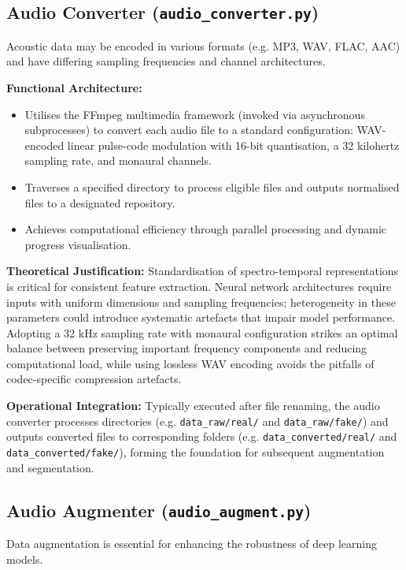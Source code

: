 \documentclass[conference]{IEEEtran}  %
\begin{document}
\subsection{Audio Converter (\texttt{audio\_converter.py})}
Acoustic data may be encoded in various formats (e.g. MP3, WAV, FLAC, AAC) and have differing sampling frequencies and channel architectures.

\textbf{Functional Architecture:}
\begin{itemize}
    \item Utilises the FFmpeg multimedia framework (invoked via asynchronous subprocesses) to convert each audio file to a standard configuration: WAV-encoded linear pulse-code modulation with 16-bit quantisation, a 32 kilohertz sampling rate, and monaural channels.
    \item Traverses a specified directory to process eligible files and outputs normalised files to a designated repository.
    \item Achieves computational efficiency through parallel processing and dynamic progress visualisation.
\end{itemize}

\textbf{Theoretical Justification:} Standardisation of spectro-temporal representations is critical for consistent feature extraction. Neural network architectures require inputs with uniform dimensions and sampling frequencies; heterogeneity in these parameters could introduce systematic artefacts that impair model performance. Adopting a 32 kHz sampling rate with monaural configuration strikes an optimal balance between preserving important frequency components and reducing computational load, while using lossless WAV encoding avoids the pitfalls of codec-specific compression artefacts.

\textbf{Operational Integration:} Typically executed after file renaming, the audio converter processes directories (e.g. \texttt{data\_raw/real/} and \texttt{data\_raw/fake/}) and outputs converted files to corresponding folders (e.g. \texttt{data\_converted/real/} and \texttt{data\_converted/fake/}), forming the foundation for subsequent augmentation and segmentation.

\subsection{Audio Augmenter (\texttt{audio\_augment.py})}
Data augmentation is essential for enhancing the robustness of deep learning models.
\end{document}
